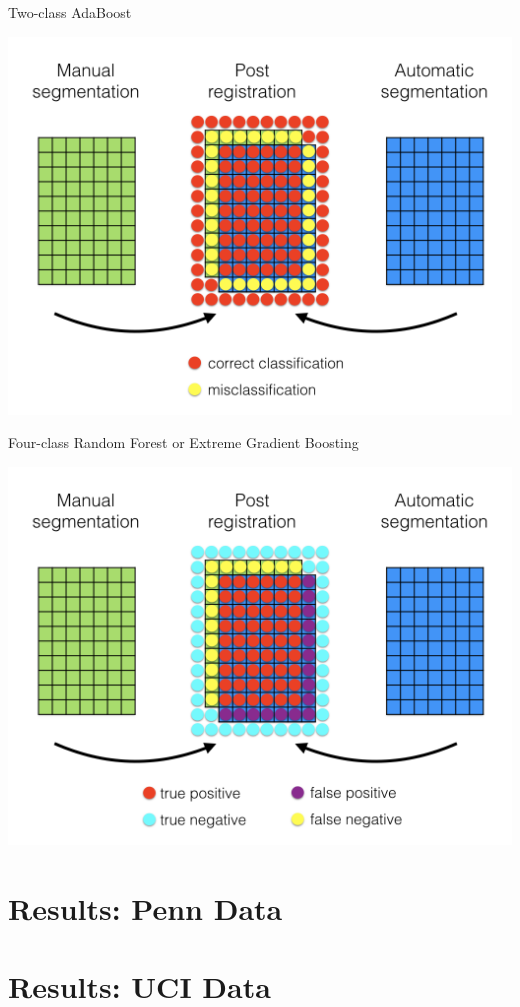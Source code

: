 \documentclass[ignorenonframetext,]{beamer}
\begin{document}
\begin{frame}{Two-class AdaBoost}

\centering
\includegraphics[width=0.85 \textwidth]{../Figures/correctiveLearning002.png}

\end{frame}

\begin{frame}{Four-class Random Forest or Extreme Gradient Boosting}

\centering
\includegraphics[width=0.85 \textwidth]{../Figures/correctiveLearning003.png}

\end{frame}

\section{Results: Penn Data}\label{results-penn-data}

\section*{Results: UCI Data}\label{results-uci-data}

\hypertarget{refs}{}
\end{document}
